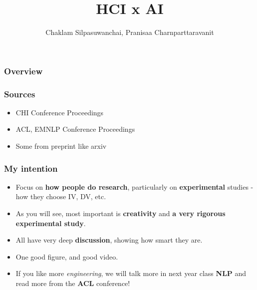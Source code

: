 \documentclass{beamer}
\title[HCI x AI]{HCI x AI} %
\author{Chaklam Silpasuwanchai, Pranisaa Charnparttaravanit} %
\institute[AIT] %
{
Asian Institute of Technology \\ %
\medskip
\textit{chaklam@ait.asia} %
}
\date{} %
\begin{document}
\begin{frame}
\titlepage %
\end{frame}

\begin{frame}
\frametitle{Overview} %
\footnotesize
\tableofcontents
\end{frame}


\begin{frame}
\frametitle{Sources} 
\begin{itemize}
	\item CHI Conference Proceedings
    \item ACL, EMNLP Conference Proceedings
    \item Some from preprint like arxiv
\end{itemize}
\end{frame}

\begin{frame}
\frametitle{My intention} 
\begin{itemize}
	\item Focus on \textbf{how people do research}, particularly on \textbf{experimental} studies - how they choose IV, DV, etc.
    \item As you will see, most important is \textbf{creativity} and \textbf{a very rigorous experimental study}.
    \item All have very deep \textbf{discussion}, showing how smart they are.
    \item One good figure, and good video.
    \item If you like more \textit{engineering},  we will talk more in next year class \textbf{NLP} and read more from the \textbf{ACL} conference!
\end{itemize}
\end{frame}
\end{document}
